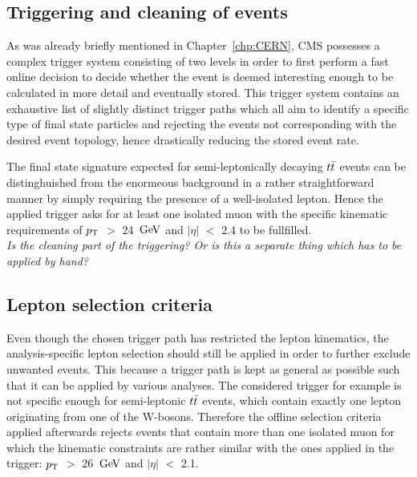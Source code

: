 \subsection{Triggering and cleaning of events}\label{subsec::Trigger}
As was already briefly mentioned in Chapter~\ref{chp:CERN}, CMS possesses a complex trigger system consisting of two levels in order to first perform a fast online decision to decide whether the event is deemed interesting enough to be calculated in more detail and eventually stored.
This trigger system contains an exhaustive list of slightly distinct trigger paths which all aim to identify a specific type of final state particles and rejecting the events not corresponding with the desired event topology, hence drastically reducing the stored event rate.

The final state signature expected for semi-leptonically decaying $t\bar{t}$ events can be distinghuished from the enormeous background in a rather straightforward manner by simply requiring the presence of a well-isolated lepton.
Hence the applied trigger asks for at least one isolated muon with the specific kinematic requirements of $p_{\rm T}$ $>$ 24 $\, \mathrm{GeV}$ and $\vert \eta \vert$ $<$ 2.4 to be fullfilled.
\\
\textit{Is the cleaning part of the triggering? Or is this a separate thing which has to be applied by hand?}

\subsection{Lepton selection criteria}
Even though the chosen trigger path has restricted the lepton kinematics, the analysis-specific lepton selection should still be applied in order to further exclude unwanted events.
This because a trigger path is kept as general as possible such that it can be applied by various analyses.
The considered trigger for example is not specific enough for semi-leptonic $t\bar{t}$ events, which contain exactly one lepton originating from one of the W-bosons.
Therefore the offline selection criteria applied afterwards rejects events that contain more than one isolated muon for which the kinematic constraints are rather similar with the ones applied in the trigger: $p_{\rm T}$ $>$ 26 $\, \mathrm{GeV}$ and $\vert \eta \vert$ $<$ 2.1. 

